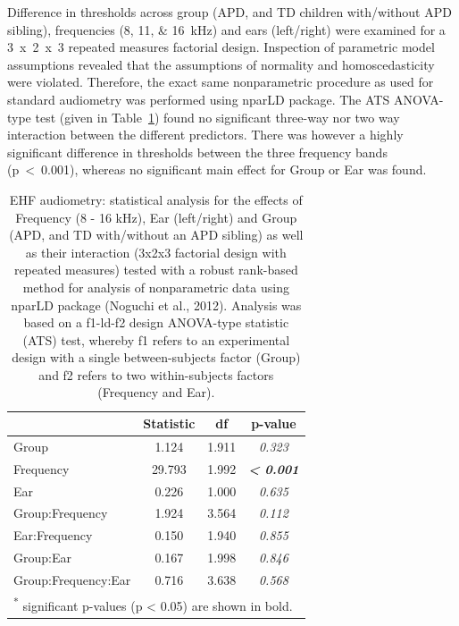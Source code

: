 \documentclass[a4paper, twoside]{templates/ociamthesis}
\begin{document}
Difference in thresholds across group (APD, and TD children with/without APD sibling), frequencies (8, 11, \& 16~kHz) and ears (left/right) were examined for a 3~x~2~x~3 repeated measures factorial design. Inspection of parametric model assumptions revealed that the assumptions of normality and homoscedasticity were violated. Therefore, the exact same nonparametric procedure as used for standard audiometry was performed using nparLD package. The ATS ANOVA-type test (given in Table~\ref{tab:EHF-TabnparLD}) found no significant three-way nor two way interaction between the different predictors. There was however a highly significant difference in thresholds between the three frequency bands (p~\textless~0.001), whereas no significant main effect for Group or Ear was found.\\

\begin{table}

\caption{\label{tab:EHF-TabnparLD}EHF audiometry: statistical analysis for the effects of Frequency (8 - 16 kHz), Ear (left/right) and Group (APD, and TD with/without an APD sibling) as well as their interaction (3x2x3 factorial design with repeated measures) tested with a robust rank-based method for analysis of nonparametric data using nparLD package (Noguchi et al., 2012). Analysis was based on a f1-ld-f2 design ANOVA-type statistic (ATS) test, whereby f1 refers to an experimental design with a single between-subjects factor (Group) and f2 refers to two within-subjects factors (Frequency and Ear).}
\centering
\begin{tabular}[t]{lcc>{}c}
\toprule
  & Statistic & df & p-value\\
\midrule
Group & 1.124 & 1.911 & \em{0.323}\\
Frequency & 29.793 & 1.992 & \em{\textbf{< 0.001}}\\
Ear & 0.226 & 1.000 & \em{0.635}\\
Group:Frequency & 1.924 & 3.564 & \em{0.112}\\
Ear:Frequency & 0.150 & 1.940 & \em{0.855}\\
Group:Ear & 0.167 & 1.998 & \em{0.846}\\
Group:Frequency:Ear & 0.716 & 3.638 & \em{0.568}\\
\bottomrule
\multicolumn{4}{l}{\textsuperscript{*} significant p-values (p < 0.05) are shown in bold.}\\
\end{tabular}
\end{table}
\end{document}
